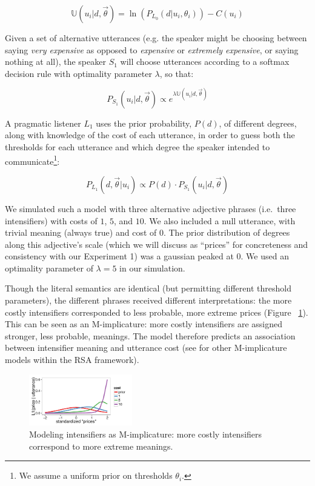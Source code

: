 \documentclass[10pt,letterpaper]{article}
\newcommand{\w}[1]{\emph{#1}}
\begin{document}
$$\mathbb{U}(u_i | d, \vec{\theta}) =  \ln\left(P_{L_0}(d | u_i, \theta_i) \right) - C(u_i) $$

Given a set of alternative utterances (e.g. the speaker might be choosing between saying \w{very expensive} as opposed to \w{expensive} or \w{extremely expensive}, or saying nothing at all), the speaker $S_1$ will choose utterances according to a softmax decision rule \cite{sutton} with optimality parameter $\lambda$, so that:

$$ P_{S_1}(u_i | d, \vec{\theta}) \propto e^{\lambda \mathbb{U}(u_i | d, \vec{\theta})} $$

A pragmatic listener $L_1$ uses the prior probability, $P(d)$, of different degrees, along with knowledge of the cost of each utterance, in order to guess both the thresholds for each utterance and which degree the speaker intended to communicate\footnote{We assume a uniform prior on thresholds $\theta_i$.}:

$$ P_{L_1}(d, \vec{\theta} | u_i) \propto P(d) \cdot P_{S_1}(u_i | d, \vec{\theta}) $$

We simulated such a model with three alternative adjective phrases (i.e.~three intensifiers) with costs of $1$, $5$, and $10$. We also included a null utterance, with trivial meaning (always true) and cost of $0$. The prior distribution of degrees along this adjective's scale (which we will discuss as ``prices'' for concreteness and consistency with our Experiment 1) was a gaussian peaked at $0$.
We used an optimality parameter of $\lambda=5$ in our simulation. 

Though the literal semantics are identical (but permitting different threshold parameters), the different phrases received different interpretations: the more costly intensifiers corresponded to less probable, more extreme prices (Figure ~\ref{model}).
This can be seen as an M-implicature: more costly intensifiers are assigned stronger, less probable, meanings. 
The model therefore predicts an association between intensifier meaning and utterance cost (see  for other M-implicature models within the RSA framework).

\begin{figure}[tbh]
\begin{center}
\includegraphics[width=0.4\textwidth]{model_results.pdf}
\end{center}
\caption{Modeling intensifiers as M-implicature: more costly intensifiers correspond to more extreme meanings.} 
\label{model}
\end{figure}
\end{document}
